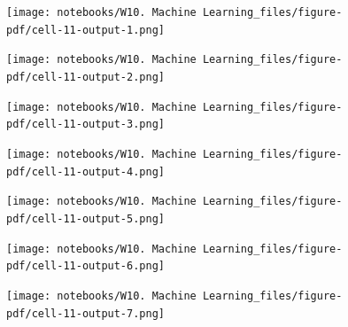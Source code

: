 \documentclass[
  letterpaper,
  DIV=11,
  numbers=noendperiod]{scrreprt}
\begin{document}
\begin{figure}[H]

{\centering \texttt{[image: notebooks/W10. Machine Learning\_files/figure-pdf/cell-11-output-1.png]}

}

\end{figure}

\begin{figure}[H]

{\centering \texttt{[image: notebooks/W10. Machine Learning\_files/figure-pdf/cell-11-output-2.png]}

}

\end{figure}

\begin{figure}[H]

{\centering \texttt{[image: notebooks/W10. Machine Learning\_files/figure-pdf/cell-11-output-3.png]}

}

\end{figure}

\begin{figure}[H]

{\centering \texttt{[image: notebooks/W10. Machine Learning\_files/figure-pdf/cell-11-output-4.png]}

}

\end{figure}

\begin{figure}[H]

{\centering \texttt{[image: notebooks/W10. Machine Learning\_files/figure-pdf/cell-11-output-5.png]}

}

\end{figure}

\begin{figure}[H]

{\centering \texttt{[image: notebooks/W10. Machine Learning\_files/figure-pdf/cell-11-output-6.png]}

}

\end{figure}

\begin{figure}[H]

{\centering \texttt{[image: notebooks/W10. Machine Learning\_files/figure-pdf/cell-11-output-7.png]}

}

\end{figure}
\end{document}

